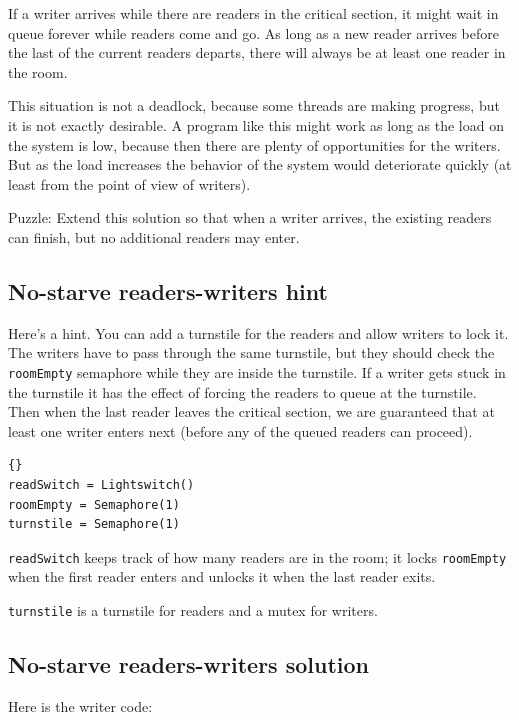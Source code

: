 \documentclass{book}
\newcommand{\clearemptydoublepage}{\newpage\cleardoublepage}
\begin{document}
If a writer arrives while there are readers in the critical section,
it might wait in queue forever while readers come and go.  As long
as a new reader arrives before the last of the current readers
departs, there will always be at least one reader in the room.

This situation is not a deadlock, because some threads are making
progress, but it is not exactly desirable.  A program like this
might work as long as the load on the system is low, because then there
are plenty of opportunities for the writers.  But as the load
increases the behavior of the system would deteriorate quickly
(at least from the point of view of writers).

Puzzle: Extend this solution so that when a writer arrives,
the existing readers can finish, but no additional readers
may enter.


\clearemptydoublepage
\subsection {No-starve readers-writers hint}  

Here's a hint.  You can add a turnstile for the readers and
allow writers to lock it.  The writers have to pass through
the same turnstile, but they should check the {\tt roomEmpty}
semaphore while they are inside the turnstile.  If a writer
gets stuck in the turnstile it has the effect of forcing the
readers to queue at the turnstile.  Then when the last reader
leaves the critical section, we are guaranteed that at least
one writer enters next (before any of the queued readers can
proceed).

\begin{lstlisting}[title={No-starve readers-writers initialization}]{}
readSwitch = Lightswitch()
roomEmpty = Semaphore(1)
turnstile = Semaphore(1)
\end{lstlisting}

{\tt readSwitch} keeps track of how many readers are in the room;
it locks {\tt roomEmpty} when the first reader
enters and unlocks it when the last reader exits.

{\tt turnstile} is a turnstile for readers and a 
mutex for writers.


\clearemptydoublepage
\subsection {No-starve readers-writers solution}  

Here is the writer code:
\end{document}
